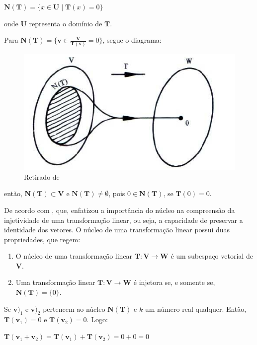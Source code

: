 \centerline{$\mathbf{N}(\mathbf{T}) = \{x \in \mathbf{U} \mid \mathbf{T}(x) = 0\}$}

\noindent onde $\mathbf{U}$ representa o domínio de $\mathbf{T}$.

Para $\mathbf{N}(\mathbf{T}) = \{\mathbf{v} \in \frac{\mathbf{V}}{\mathbf{T}(\mathbf{v})} = 0\}$, segue o diagrama:

\begin{figure}[H]
	\centering
	\includegraphics[scale=1.00]{t_nucleo.png}
	\caption{Retirado de \cite{steinbruch1987}}
\end{figure}

\noindent então, $\mathbf{N}(\mathbf{T}) \subset \mathbf{V}$ e $\mathbf{N}(\mathbf{T}) \neq \emptyset$, pois $0 \in \mathbf{N}(\mathbf{T})$, se $\mathbf{T}(0) = 0$.

De acordo com \cite{lang2003}, que, enfatizou a importância do núcleo na compreensão da injetividade de uma transformação linear, ou seja, a capacidade de preservar a identidade dos vetores. O núcleo de uma transformação linear possui duas propriedades, que regem:

\begin{enumerate}
	\item O núcleo de uma transformação linear $\mathbf{T}: \mathbf{V} \longrightarrow \mathbf{W}$ é um subespaço vetorial de $\mathbf{V}$.
	\item Uma transformação linear $\mathbf{T}: \mathbf{V} \longrightarrow \mathbf{W}$ é injetora se, e somente se, $\mathbf{N}(\mathbf{T}) = \{0\}$.
\end{enumerate}

Se $\mathbf{v)}_1$ e $\mathbf{v)}_2$ pertencem ao núcleo $\mathbf{N}(\mathbf{T})$ e $k$ um número real qualquer. Então, $\mathbf{T}(\mathbf{v}_1) = 0$ e $\mathbf{T}(\mathbf{v}_2) = 0$. Logo:

\centerline{$\mathbf{T}(\mathbf{v}_1 + \mathbf{v}_2) = \mathbf{T}(\mathbf{v}_1) + \mathbf{T}(\mathbf{v}_2) = 0 + 0 = 0$}

